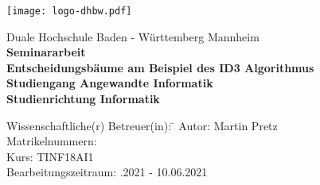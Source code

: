 \begin{titlepage}
    \begin{minipage}{\textwidth}
        \vspace{-2cm}
        \texttt{[image: logo-dhbw.pdf]}
    \end{minipage}
    \vspace{1em}

    \begin{center}
		{\textsf{\large Duale Hochschule Baden - W\"urttemberg Mannheim}}\\[4em]
		{\textsf{\textbf{\large{Seminararbeit}}}}\\[6mm]                                 %
		{\textsf{\textbf{\Large{Entscheidungsbäume am Beispiel des ID3 Algorithmus}}}} \\[1.5cm]                        %
		{\textsf{\textbf{\large{Studiengang Angewandte Informatik}}}}\\[6mm]
		{\textsf{\textbf{Studienrichtung Informatik}}}\vspace{10em}

		\begin{minipage}{\textwidth}
			\begin{tabbing}
				Wissenschaftliche(r) Betreuer(in): \hspace{0.85cm}\=\kill
				Autor: \> Martin Pretz \\[1.5mm]
				Matrikelnummern:  \\[1.5mm]
				Kurs: \> TINF18AI1 \\[1.5mm]
				Bearbeitungszeitraum: .2021 - 10.06.2021 \\[1.5mm]
			\end{tabbing}
		\end{minipage}
	\end{center}
\end{titlepage}